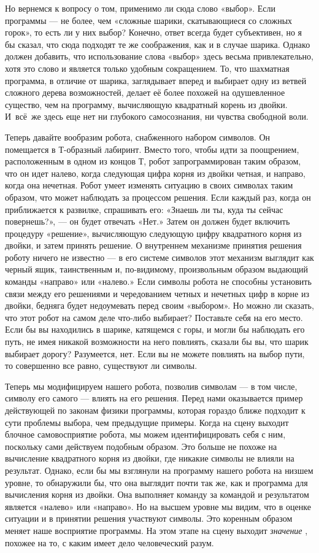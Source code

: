 \documentclass[../main.tex]{subfiles}
\begin{document}
Но вернемся к вопросу о том, применимо ли сюда слово «выбор». Если программы --- не более, чем «сложные шарики, скатывающиеся со сложных горок», то есть ли у них выбор? Конечно, ответ всегда будет субъективен, но я бы сказал, что сюда подходят те же соображения, как и в случае шарика. Однако должен добавить, что использование слова «выбор» здесь весьма привлекательно, хотя это слово и является только удобным сокращением. То, что шахматная программа, в отличие от шарика, заглядывает вперед и выбирает одну из ветвей сложного дерева возможностей, делает её более похожей на одушевленное существо, чем на программу, вычисляющую квадратный корень из двойки. И~всё~же здесь еще нет ни глубокого самосознания, ни чувства свободной воли.

Теперь давайте вообразим робота, снабженного набором символов. Он помещается в Т-образный лабиринт. Вместо того, чтобы идти за поощрением, расположенным в одном из концов Т, робот запрограммирован таким образом, что он идет налево, когда следующая цифра корня из двойки четная, и направо, когда она нечетная. Робот умеет изменять ситуацию в своих символах таким образом, что может наблюдать за процессом решения. Если каждый раз, когда он приближается к развилке, спрашивать его: «Знаешь ли ты, куда ты сейчас повернешь?», --- он будет отвечать «Нет.» Затем он должен будет включить процедуру «решение», вычисляющую следующую цифру квадратного корня из двойки, и затем принять решение. О внутреннем механизме принятия решения роботу ничего не известно --- в его системе символов этот механизм выглядит как черный ящик, таинственным и, по-видимому, произвольным образом выдающий команды «направо» или «налево.» Если символы робота не способны установить связи между его решениями и чередованием четных и нечетных цифр в корне из двойки, бедняга будет недоумевать перед своим «выбором». Но можно ли сказать, что этот робот на самом деле что-либо выбирает? Поставьте себя на его место. Если бы вы находились в шарике, катящемся с горы, и могли бы наблюдать его путь, не имея никакой возможности на него повлиять, сказали бы вы, что шарик выбирает дорогу? Разумеется, нет. Если вы не можете повлиять на выбор пути, то совершенно все равно, существуют ли символы.

Теперь мы модифицируем нашего робота, позволив символам --- в том числе, символу его самого --- влиять на его решения. Перед нами оказывается пример действующей по законам физики программы, которая гораздо ближе подходит к сути проблемы выбора, чем предыдущие примеры. Когда на сцену выходит блочное самовосприятие робота, мы можем идентифицировать себя с ним, поскольку сами действуем подобным образом. Это больше не похоже на вычисление квадратного корня из двойки, где никакие символы не влияли на результат. Однако, если бы мы взглянули на программу нашего робота на низшем уровне, то обнаружили бы, что она выглядит почти так же, как и программа для вычисления корня из двойки. Она выполняет команду за командой и результатом является «налево» или «направо». Но на высшем уровне мы видим, что в оценке ситуации и в принятии решения участвуют символы. Это коренным образом меняет наше восприятие программы. На этом этапе на сцену выходит \emph{значение} , похожее на то, с каким имеет дело человеческий разум.
\end{document}
